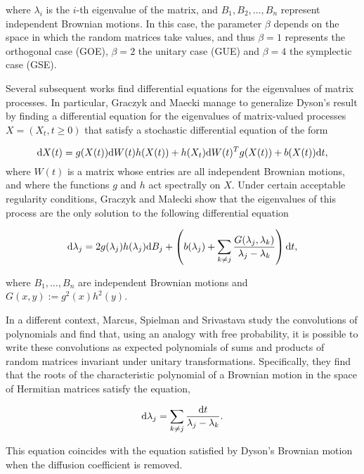 where $\lambda_i$ is the $i$-th eigenvalue of the matrix, and $B_1, B_2,\dots,B_n$ represent independent Brownian motions. In this case, the parameter $\beta$ depends on the space in which the random matrices take values, and thus $\beta=1$ represents the orthogonal case (GOE), $\beta=2$ the unitary case (GUE) and $\beta=4$ the symplectic case (GSE).

Several subsequent works find differential equations for the eigenvalues of matrix processes. In particular, Graczyk and Maecki \cite{article:multiyamada} manage to generalize Dyson's result by finding a differential equation for the eigenvalues of matrix-valued processes $X = (X_t, t\ge 0)$ that satisfy a stochastic differential equation of the form

\begin{equation}
\mathrm d X(t) = g(X(t))\mathrm d W(t)h(X(t)) + h(X_t)\mathrm d W(t)^Tg(X(t)) + b(X(t))\mathrm d t,
\end{equation}
where $W(t)$ is a matrix whose entries are all independent Brownian motions, and where the functions $g$ and $h$ act spectrally on $X$. Under certain acceptable regularity conditions, Graczyk and Małecki show that the eigenvalues of this process are the only solution to the following differential equation

\begin{equation}
\mathrm d\lambda_j = 2g(\lambda_j)h(\lambda_j)\mathrm d B_j + \left( b(\lambda_j) + \sum_{k\neq j} \frac{G(\lambda_j,\lambda_k)}{\lambda_j - \lambda_k} \right)\mathrm d t,
\end{equation}

where $B_1,\dots,B_n$ are independent Brownian motions and $G(x,y) := g^2(x)h^2(y)$.

In a different context, Marcus, Spielman and Srivastava \cite{article:finitefree} study the convolutions of polynomials and find that, using an analogy with free probability, it is possible to write these convolutions as expected polynomials of sums and products of random matrices invariant under unitary transformations. Specifically, they find that the roots of the characteristic polynomial of a Brownian motion in the space of Hermitian matrices satisfy the equation,

\begin{equation} \label{eq:det_dys}
\mathrm d\lambda_j = \sum_{k\neq j} \frac{\mathrm d t}{\lambda_j-\lambda_k}.
\end{equation}

This equation coincides with the equation satisfied by Dyson's Brownian motion when the diffusion coefficient is removed.

